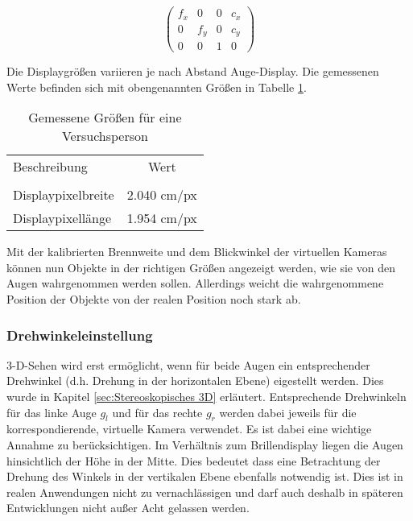 %

\begin{equation}
\begin{pmatrix}
f_x & 0& 0& c_x \\
0 & f_y & 0 & c_y\\ 
0 & 0&   1 & 0  
\end{pmatrix}
\label{table:instrisische Kameraparameter}
\end{equation}

Die Displaygrößen variieren je nach Abstand Auge-Display. Die gemessenen Werte befinden sich mit obengenannten Größen in Tabelle \ref{table:Messwerte DisplayAuge}.
%
 \begin{table}[ht]

 \begin{tabular}{lc} 
  Beschreibung & Wert \\ \\
  Displaypixelbreite & 2.040 cm/px \\
  Displaypixellänge &  1.954 cm/px \\
 \end{tabular}
 \caption{Gemessene Größen für eine Versuchsperson}
 \label{table:Messwerte DisplayAuge}
 \end{table}


%
Mit der kalibrierten Brennweite und dem Blickwinkel der virtuellen Kameras können nun Objekte in der richtigen Größen angezeigt werden, wie sie von den Augen wahrgenommen werden sollen. Allerdings weicht die wahrgenommene Position der Objekte von der realen Position noch stark ab. 

\subsubsection{Drehwinkeleinstellung}
3-D-Sehen wird erst ermöglicht, wenn für beide Augen ein entsprechender Drehwinkel (d.h. Drehung in der horizontalen Ebene) eigestellt werden. Dies wurde in Kapitel \ref{sec:Stereoskopisches 3D} erläutert.  Entsprechende Drehwinkeln für das linke Auge $g_{l}$ und für das rechte $g_{r}$ werden dabei jeweils für die korrespondierende, virtuelle Kamera verwendet.
Es ist dabei eine wichtige Annahme zu berücksichtigen. Im Verhältnis zum Brillendisplay liegen die Augen hinsichtlich der Höhe in der Mitte. Dies bedeutet dass eine Betrachtung der Drehung des Winkels in der vertikalen Ebene ebenfalls notwendig ist. Dies ist in realen Anwendungen nicht zu vernachlässigen und darf auch deshalb in späteren Entwicklungen nicht außer Acht gelassen werden.


